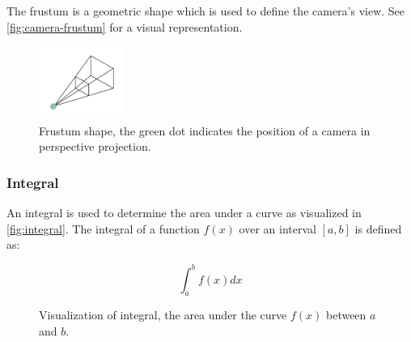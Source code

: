 The frustum is a geometric shape which is used to define the camera's view. See \autoref{fig:camera-frustum} for a visual representation.

\begin{figure}[H]
  \centering
  \includegraphics[width=0.25\textwidth]{resources/camera-frustum.png}
  \caption{Frustum shape, the green dot indicates the position of a camera in perspective projection.}
  \label{fig:camera-frustum}
\end{figure}

\subsubsection{Integral}

An integral is used to determine the area under a curve as visualized in \autoref{fig:integral}. The integral of a function $f(x)$ over an interval $[a, b]$ is defined as:

\begin{equation}
  \label{eqn:integral}
  \int_{a}^{b} f(x) dx
\end{equation}

\begin{figure}[H]
  \centering
  \caption{Visualization of integral, the area under the curve $f(x)$ between $a$ and $b$.}
  \label{fig:integral}
\end{figure}

